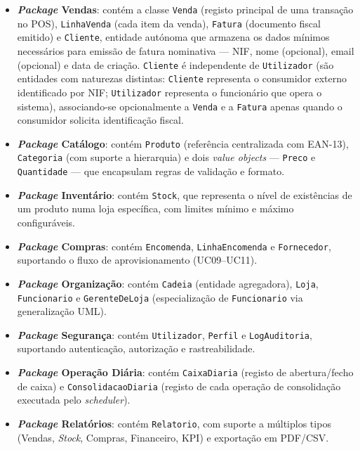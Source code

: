 \begin{itemize}
    \item \textbf{\textit{Package} Vendas}: contém a classe \texttt{Venda} (registo principal de uma transação no POS), \texttt{LinhaVenda} (cada item da venda), \texttt{Fatura} (documento fiscal emitido) e \texttt{Cliente}, entidade autónoma que armazena os dados mínimos necessários para emissão de fatura nominativa --- NIF, nome (opcional), email (opcional) e data de criação. \texttt{Cliente} é independente de \texttt{Utilizador} (são entidades com naturezas distintas: \texttt{Cliente} representa o consumidor externo identificado por NIF; \texttt{Utilizador} representa o funcionário que opera o sistema), associando-se opcionalmente a \texttt{Venda} e a \texttt{Fatura} apenas quando o consumidor solicita identificação fiscal.
    \item \textbf{\textit{Package} Catálogo}: contém \texttt{Produto} (referência centralizada com EAN-13), \texttt{Categoria} (com suporte a hierarquia) e dois \textit{value objects} --- \texttt{Preco} e \texttt{Quantidade} --- que encapsulam regras de validação e formato.
    \item \textbf{\textit{Package} Inventário}: contém \texttt{Stock}, que representa o nível de existências de um produto numa loja específica, com limites mínimo e máximo configuráveis.
    \item \textbf{\textit{Package} Compras}: contém \texttt{Encomenda}, \texttt{LinhaEncomenda} e \texttt{Fornecedor}, suportando o fluxo de aprovisionamento (UC09--UC11).
    \item \textbf{\textit{Package} Organização}: contém \texttt{Cadeia} (entidade agregadora), \texttt{Loja}, \texttt{Funcionario} e \texttt{GerenteDeLoja} (especialização de \texttt{Funcionario} via generalização UML).
    \item \textbf{\textit{Package} Segurança}: contém \texttt{Utilizador}, \texttt{Perfil} e \texttt{LogAuditoria}, suportando autenticação, autorização e rastreabilidade.
    \item \textbf{\textit{Package} Operação Diária}: contém \texttt{CaixaDiaria} (registo de abertura/fecho de caixa) e \texttt{ConsolidacaoDiaria} (registo de cada operação de consolidação executada pelo \textit{scheduler}).
    \item \textbf{\textit{Package} Relatórios}: contém \texttt{Relatorio}, com suporte a múltiplos tipos (Vendas, \textit{Stock}, Compras, Financeiro, KPI) e exportação em PDF/CSV.
\end{itemize}

